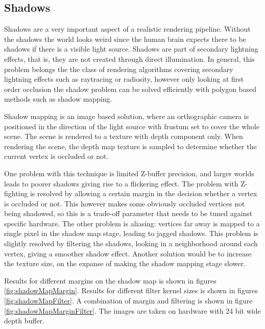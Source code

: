 \documentclass{article}
\begin{document}
\subsection{Shadows}
Shadows are a very important aspect of a realistic rendering pipeline. Without the shadows the world looks weird since the human brain expects there to be shadows if there is a visible light source. Shadows are part of secondary lightning effects, that is, they are not created through direct illumination.
In general, this problem belongs the the class of rendering algorithms covering secondary lightning effects such as raytracing or radiosity,
however only looking at first order occlusion the shadow problem can be solved efficiently with polygon based methods such as shadow mapping.

Shadow mapping is an image based solution, where an orthographic camera is positioned in the direction of the light source with frustum set to cover the whole scene. The scene is rendered to a texture with depth component only. When rendering the scene, the depth map texture is sampled to determine whether the current vertex is occluded or not.

One problem with this technique is limited Z-buffer precision, and larger worlds leads to poorer shadows giving rise to a flickering effect. The problem with Z-fighting is resolved by allowing a certain margin in the decision whether a vertex is occluded or not. This however makes some obviously occluded vertices not being shadowed, so this is a trade-off parameter that needs to be tuned against specific hardware.
The other problem is aliasing: vertices far away is mapped to a single pixel in the shadow map stage, leading to jagged shadows. This problem is slightly resolved by filtering the shadows, looking in a neighborhood around each vertex, giving a smoother shadow effect. Another solution would be to increase the texture size, on the expanse of making the shadow mapping stage slower.

Results for different margins on the shadow map is shown in figures \ref{fig:shadowMapMargin}.
Results for different filter kernel sizes is shown in figures \ref{fig:shadowMapFilter}.
A combination of margin and filtering is shown in figure \ref{fig:shadowMapMarginFilter}.
The images are taken on hardware with 24 bit wide depth buffer.
\end{document}
